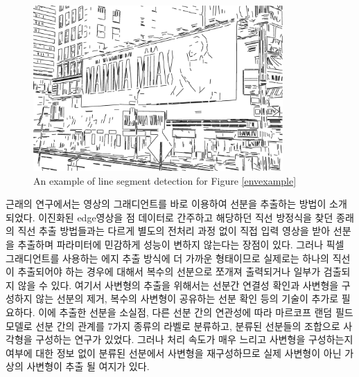 \documentclass[master,korean,final]{cbnu-ecs}
\begin{document}
\begin{figure}[!ht]
  \centering
	\includegraphics[width=360px]{img/BroadwayPlayers_01_lsd.eps}
  \caption{An example of line segment detection\cite{GromponeVonGioi2010} for Figure \ref{envexample} }
\label{lsdexample}
\end{figure}

 근래의 연구에서는 영상의 그래디언트를 바로 이용하여 선분을 추출하는 방법이 소개되었다\cite{GromponeVonGioi2010}. 이진화된 edge영상을 점 데이터로 간주하고 해당하던 직선 방정식을 찾던 종래의 직선 추출 방법들과는 다르게 별도의 전처리 과정 없이 직접 입력 영상을 받아 선분을 추출하며 파라미터에 민감하게 성능이 변하지 않는다는 장점이 있다. 그러나 픽셀 그래디언트를 사용하는 에지 추출 방식에 더 가까운 형태이므로 실제로는 하나의 직선이 추출되어야 하는 경우에 대해서 복수의 선분으로 쪼개져 출력되거나 일부가 검출되지 않을 수 있다. 여기서 사변형의 추출을 위해서는 선분간 연결성 확인과 사변형을 구성하지 않는 선분의 제거, 복수의 사변형이 공유하는 선분 확인 등의 기술이 추가로 필요하다. 이에 추출한 선분을 소실점, 다른 선분 간의 연관성에 따라 마르코프 랜덤 필드 모델로 선분 간의 관계를 7가지 종류의 라벨로 분류하고, 분류된 선분들의 조합으로 사각형을 구성하는 연구가 있었다\cite{Wildenauer2008}. 그러나 처리 속도가 매우 느리고 사변형을 구성하는지 여부에 대한 정보 없이 분류된 선분에서 사변형을 재구성하므로 실제 사변형이 아닌 가상의 사변형이 추출 될 여지가 있다. \\
\end{document}
